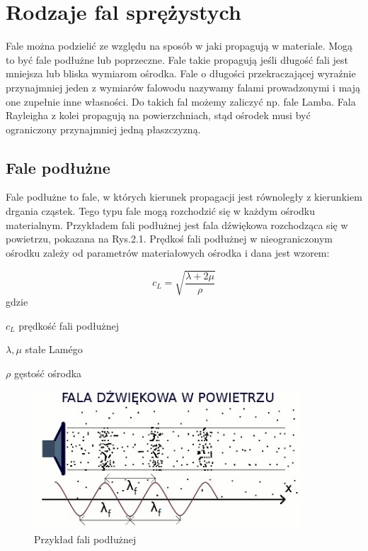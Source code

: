 
\section{Rodzaje fal sprężystych}
\label{sec:rodzaje_fal_sprezystych}

Fale można podzielić ze względu na sposób w jaki propagują w materiale. Mogą to być fale podłużne lub poprzeczne. Fale takie propagują jeśli długość fali jest mniejsza lub bliska wymiarom ośrodka. Fale o długości przekraczającej wyraźnie przynajmniej jeden z wymiarów falowodu nazywamy falami prowadzonymi i mają one zupełnie inne własności. Do takich fal możemy zaliczyć np. fale Lamba. Fala Rayleigha z kolei propagują na powierzchniach, stąd ośrodek musi być ograniczony przynajmniej jedną płaszczyzną.

\subsection{Fale podłużne}

Fale podłużne to fale, w których kierunek propagacji jest równoległy z kierunkiem drgania cząstek. Tego typu fale mogą rozchodzić się w każdym ośrodku materialnym. Przykładem fali podłużnej jest fala dźwiękowa rozchodząca się w powietrzu, pokazana na Rys.2.1. Prędkoś fali podłużnej w nieograniczonym ośrodku zależy od parametrów materiałowych ośrodka i dana jest wzorem:

\begin{equation}
c_L=\sqrt{\frac{\lambda+2\mu}{\rho}}
\end{equation}
gdzie
\begin{eqwhere}[2cm]
        \item[$c_L$] prędkość fali podłużnej
        \item[$\lambda, \mu$] stałe Lam\'{e}go
        \item[$\rho$] gęstość ośrodka
\end{eqwhere}

\begin{figure}[h]
\centering
\includegraphics[width=10cm]{Zdjecia/2/fala_podluzna}
\caption{Przykład fali podłużnej}
\label{fig:fala_podluzna}
\end{figure}


